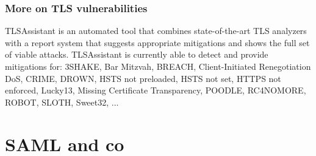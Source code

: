 \documentclass[a4paper, 10pt, titlepage]{article}
\begin{document}
\subsubsection{More on TLS vulnerabilities}
TLSAssistant is an automated tool that combines state-of-the-art TLS analyzers with a report system that suggests appropriate mitigations and shows the full set of viable attacks. TLSAssistant is currently able to detect and provide mitigations for: 3SHAKE, Bar Mitzvah, BREACH, Client-Initiated Renegotiation DoS, CRIME, DROWN, HSTS not preloaded, HSTS not set, HTTPS not enforced, Lucky13, Missing Certificate Transparency, POODLE, RC4NOMORE, ROBOT, SLOTH, Sweet32, ...

\newpage
\section{SAML and co}
\end{document}
